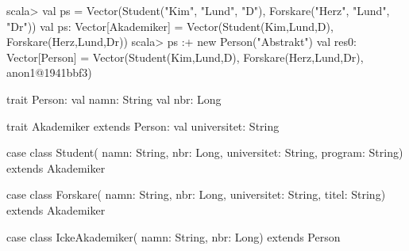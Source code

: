 \begin{REPLsmall}
scala> val ps = Vector(Student("Kim", "Lund", "D"), Forskare("Herz", "Lund", "Dr"))
val ps: Vector[Akademiker] = Vector(Student(Kim,Lund,D), Forskare(Herz,Lund,Dr))
scala> ps :+ new Person("Abstrakt") {}
val res0: Vector[Person] = 
  Vector(Student(Kim,Lund,D), Forskare(Herz,Lund,Dr), anon1@1941bbf3)
\end{REPLsmall}

\SubtaskSolved
\begin{Code}
trait Person: 
  val namn: String 
  val nbr: Long

trait Akademiker extends Person:
  val universitet: String

case class Student(
  namn: String,
  nbr: Long,
  universitet: String,
  program: String) extends Akademiker

case class Forskare(
  namn: String,
  nbr: Long,
  universitet: String,
  titel: String) extends Akademiker

case class IckeAkademiker(
    namn: String,
    nbr: Long) extends Person
\end{Code}



\QUESTEND








\ExtraTasks %







